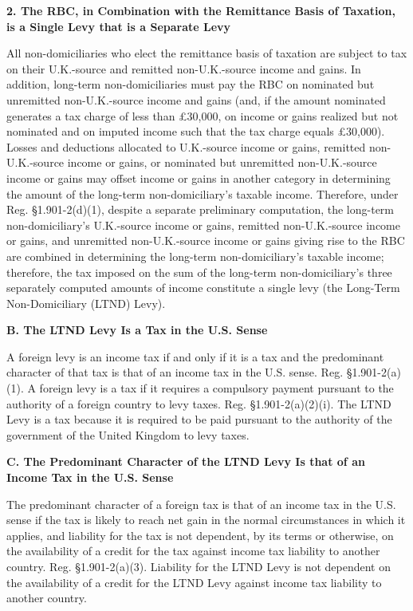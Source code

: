 \begin{select}
\begin{center}
\textbf{2. The RBC, in Combination with the Remittance Basis of Taxation, is a Single Levy that is a Separate Levy}
\end{center}

All non-domiciliaries who elect the remittance basis of taxation are subject to tax on their U.K.-source and remitted non-U.K.-source income and gains. In addition, long-term non-domiciliaries must pay the RBC on nominated but unremitted non-U.K.-source income and gains (and, if the amount nominated generates a tax charge of less than \pounds30,000, on income or gains realized but not nominated and on imputed income such that the tax charge equals \pounds30,000). Losses and deductions allocated to U.K.-source income or gains, remitted non-U.K.-source income or gains, or nominated but unremitted non-U.K.-source income or gains may offset income or gains in another category in determining the amount of the long-term non-domiciliary's taxable income. Therefore, under Reg. \S1.901-2(d)(1), despite a separate preliminary computation, the long-term non-domiciliary's U.K.-source income or gains, remitted non-U.K.-source income or gains, and unremitted non-U.K.-source income or gains giving rise to the RBC are combined in determining the long-term non-domiciliary's taxable income; therefore, the tax imposed on the sum of the long-term non-domiciliary's three separately computed amounts of income constitute a single levy (the Long-Term Non-Domiciliary (LTND) Levy).

\begin{center}
\textbf{B. The LTND Levy Is a Tax in the U.S. Sense}
\end{center}

A foreign levy is an income tax if and only if it is a tax and the predominant character of that tax is that of an income tax in the U.S. sense. Reg. \S1.901-2(a)(1). A foreign levy is a tax if it requires a compulsory payment pursuant to the authority of a foreign country to levy taxes. Reg. \S1.901-2(a)(2)(i). The LTND Levy is a tax because it is required to be paid pursuant to the authority of the government of the United Kingdom to levy taxes.

\begin{center}
\textbf{C. The Predominant Character of the LTND Levy Is that of an Income Tax in the U.S. Sense}
\end{center}

The predominant character of a foreign tax is that of an income tax in the U.S. sense if the tax is likely to reach net gain in the normal circumstances in which it applies, and liability for the tax is not dependent, by its terms or otherwise, on the availability of a credit for the tax against income tax liability to another country. Reg. \S1.901-2(a)(3). Liability for the LTND Levy is not dependent on the availability of a credit for the LTND Levy against income tax liability to another country.


\end{select}
